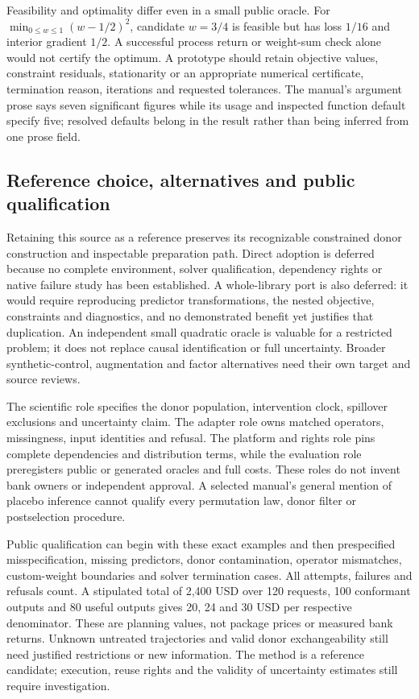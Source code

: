 Feasibility and optimality differ even in a small public oracle. For
$\min_{0\leq w\leq1}(w-1/2)^2$, candidate $w=3/4$ is feasible but has
loss $1/16$ and interior gradient $1/2$. A successful process return or
weight-sum check alone would not certify the optimum. A prototype should
retain objective values, constraint residuals, stationarity or an appropriate
numerical certificate, termination reason, iterations and requested
tolerances. The manual's argument prose says seven significant figures
while its usage and inspected function default specify five; resolved
defaults belong in the result rather than being inferred from one prose field.
\citep{exec24_synth_source,exec24_synth_choice}

\subsection{Reference choice, alternatives and public qualification}
Retaining this source as a reference preserves its recognizable constrained
donor construction and inspectable preparation path. Direct adoption is
deferred because no complete environment, solver qualification, dependency
rights or native failure study has been established. A whole-library port
is also deferred: it would require reproducing predictor transformations,
the nested objective, constraints and diagnostics, and no demonstrated
benefit yet justifies that duplication. An independent small quadratic
oracle is valuable for a restricted problem; it does not replace causal
identification or full uncertainty. Broader synthetic-control, augmentation
and factor alternatives need their own target and source reviews.
\citep{exec24_synth_choice}

The scientific role specifies the donor population, intervention clock,
spillover exclusions and uncertainty claim. The adapter role owns matched
operators, missingness, input identities and refusal. The platform and
rights role pins complete dependencies and distribution terms, while the
evaluation role preregisters public or generated oracles and full costs.
These roles do not invent bank owners or independent approval. A selected
manual's general mention of placebo inference cannot qualify every
permutation law, donor filter or postselection procedure.
\citep{exec24_synth_choice,v12_sw_synth}

Public qualification can begin with these exact examples and then
prespecified misspecification, missing predictors, donor contamination,
operator mismatches, custom-weight boundaries and solver termination cases.
All attempts, failures and refusals count. A stipulated total of
2,400 USD over 120 requests, 100 conformant outputs and 80 useful outputs
gives 20, 24 and 30 USD per respective denominator. These are planning
values, not package prices or measured bank returns. Unknown untreated
trajectories and valid donor exchangeability still need justified
restrictions or new information. The method is a reference candidate; execution, reuse rights and the validity of uncertainty estimates still require investigation.
\citep{exec24_synth_choice}


